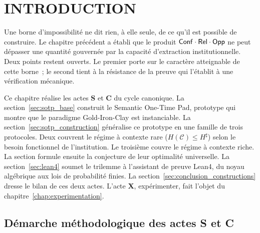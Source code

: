 
\section{INTRODUCTION}
\label{sec:introduction_constructions}

\begin{sloppypar}
Une borne d'impossibilit\'e ne dit rien, \`a elle seule, de ce qu'il est
possible de construire. Le chapitre pr\'ec\'edent a \'etabli que le produit
$\mathsf{Conf}\cdot\mathsf{Rel}\cdot\mathsf{Opp}$ ne peut d\'epasser une quantit\'e gouvern\'ee par
la capacit\'e d'extraction institutionnelle. Deux points restent
ouverts. Le premier porte sur le caract\`ere atteignable de cette borne~; le
second tient \`a la r\'esistance de la preuve qui l'\'etablit \`a
une v\'erification m\'ecanique.

Ce chapitre r\'ealise les actes \textbf{S} et \textbf{C} du cycle
canonique. La section~\ref{sec:sotp_base} construit le Semantic One-Time
Pad, prototype qui montre que le paradigme Gold-Iron-Clay est
instanciable. La section~\ref{sec:sotp_construction} g\'en\'eralise ce
prototype en une famille de trois protocoles. Deux couvrent le r\'egime \`a contexte rare
($H(\mathcal{C}) \leq H^\sharp$) selon le besoin fonctionnel de l'institution. Le troisi\`eme couvre le
r\'egime \`a contexte riche. La section formule ensuite la conjecture de leur
optimalit\'e universelle. La section~\ref{sec:lean4} soumet le
trilemme \`a l'assistant de preuve Lean4, du noyau alg\'ebrique aux lois de probabilit\'e finies. La
section~\ref{sec:conclusion_constructions} dresse le bilan de ces deux
actes. L'acte \textbf{X}, exp\'erimenter, fait l'objet du
chapitre~\ref{chap:experimentation}.

\subsection{D\'emarche m\'ethodologique des actes \textbf{S} et \textbf{C}}
\label{subsec:demarche_saturer_certifier}


\end{sloppypar}
